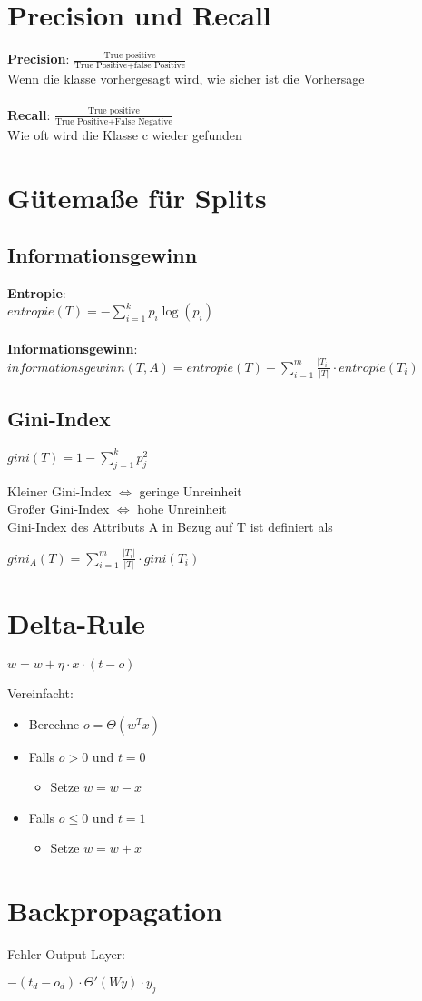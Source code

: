 \documentclass{article}
\begin{document}
\section{Precision und Recall}
\textbf{Precision}: $\frac{\text{True positive}}{\text{True Positive} + 
\text{false Positive}}$ \\
Wenn die klasse vorhergesagt wird, wie sicher ist die Vorhersage \\
\\
\textbf{Recall}: $\frac{\text{True positive}}{\text{True Positive} + 
\text{False Negative}}$ \\
Wie oft wird die Klasse c wieder gefunden
\section{Gütemaße für Splits}
\subsection{Informationsgewinn}
\textbf{Entropie}: \\
$entropie(T) = - \sum_{i = 1}^{k} p_i \log(p_i)$ \\
\\
\textbf{Informationsgewinn}: \\
$informationsgewinn(T, A) = entropie(T) -
\sum_{i = 1}^{m} \frac{|T_i|}{|T|} \cdot entropie(T_i)$
\subsection{Gini-Index}
\begin{center}
    $gini(T) = 1 - \sum_{j = 1}^k p_j^2$
\end{center}
Kleiner Gini-Index $\Leftrightarrow$ geringe Unreinheit \\
Großer Gini-Index $\Leftrightarrow$ hohe Unreinheit \\
Gini-Index des Attributs A in Bezug auf T ist definiert als
\begin{center}
    $gini_A(T) = \sum_{i = 1}^m \frac{|T_i|}{|T|} \cdot gini(T_i)$
\end{center}
\section{Delta-Rule}
\begin{center}
    $w = w + \eta \cdot x \cdot (t - o)$
\end{center}
Vereinfacht: \\
\begin{itemize}
    \item Berechne $o = \Theta(w^T x)$
    \item Falls $o > 0$ und $t = 0$
    \begin{itemize}
        \item Setze $w = w - x$
    \end{itemize}
    \item Falls $o \leq 0$ und $t = 1$
    \begin{itemize}
        \item Setze $w = w + x$
    \end{itemize}
\end{itemize}
\section{Backpropagation}
Fehler Output Layer:
\begin{center}
    $-(t_d - o_d) \cdot \Theta'(W y) \cdot y_j$
\end{center}
\end{document}
